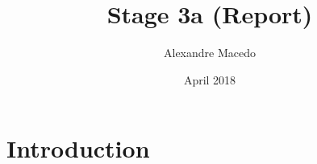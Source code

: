 \documentclass{article}
\title{Stage 3a (Report)}
\author{Alexandre Macedo}
\date{April 2018}
\begin{document}
    
    \maketitle
    
    \section{Introduction}
    
    
\end{document}
